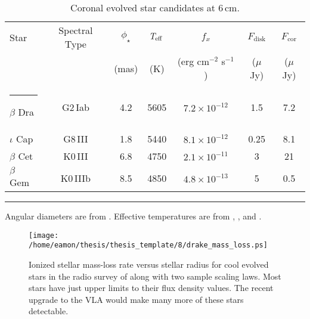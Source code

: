 \begin{table}[hb]
\begin{center}
\caption[Coronal evolved star candidates]{Coronal evolved star candidates at 6\,cm.}
\begin{tabular}{lcccccc}
\hline
\hline
\rule{0pt}{2.5ex}Star &Spectral Type & $\phi _{\star}$  & $T_{\rm{eff}}$ & $f_{x}$  & $F_{\mathrm{disk}}$ &$F_{\mathrm{cor}}$\\
\rule{0pt}{2.5ex}&  & (mas) & (K) & (erg cm$^{-2}$ s$^{-1}$) & ($\mu$Jy)&($\mu$Jy)\\
\hline
\rule{-2.5pt}{2.5ex}	$\beta$ Dra & G2\,Iab &  4.2 & 5605 & $7.2\times 10^{-12}$& 1.5&7.2\\
					$\iota$ Cap & G8\,III &  1.8 & 5440 & $8.1\times 10^{-12}$ & 0.25&8.1\\
					$\beta$ Cet& K0\,III & 6.8 & 4750 & $2.1\times 10^{-11}$& 3&21\\
					$\beta$ Gem & K0\,IIIb & 8.5 & 4850 & $4.8\times 10^{-13}$&5&0.5\\
\hline
\end{tabular}
\label{tab:8.2}
\begin{minipage}{13.0cm}
\rule{-2.5pt}{2.5ex}{\footnotesize Angular diameters are from \cite{fracassini_1981}. Effective temperatures are from \cite{mcwilliam_1990}, \cite{luck_1995}, and \cite{blackwell_1986}.}
\end{minipage}
\end{center}
\end{table}

\begin{figure}[!hb]
\centering 
        \texttt{[image: /home/eamon/thesis/thesis\_template/8/drake\_mass\_loss.ps]}
\caption[Ionized stellar mass-loss rate vs. stellar radius]{Ionized stellar mass-loss rate versus stellar radius for cool evolved stars in the radio survey of \cite{drake_1986} along with two sample scaling laws. Most stars have just upper limits to their flux density values. The recent upgrade to the VLA would make many more of these stars detectable.} 
\label{fig:8.5}
\end{figure}

